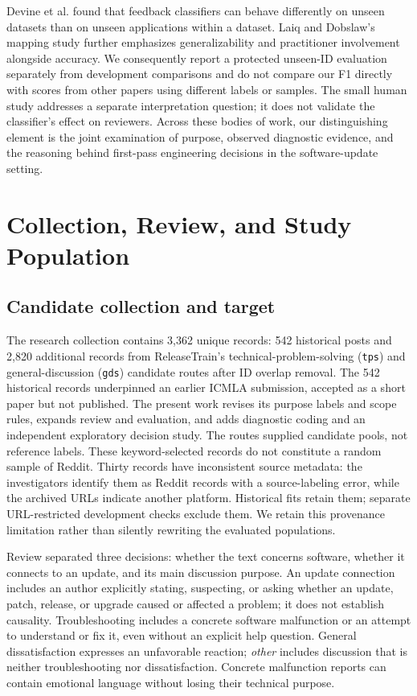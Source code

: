 \documentclass[conference,letterpaper]{IEEEtran}
\begin{document}
Devine et al. \cite{Devine2023Transfer} found that feedback classifiers can behave differently on unseen datasets than on unseen applications within a dataset. Laiq and Dobslaw's mapping study \cite{Laiq2026Mapping} further emphasizes generalizability and practitioner involvement alongside accuracy. We consequently report a protected unseen-ID evaluation separately from development comparisons and do not compare our F1 directly with scores from other papers using different labels or samples. The small human study addresses a separate interpretation question; it does not validate the classifier's effect on reviewers. Across these bodies of work, our distinguishing element is the joint examination of purpose, observed diagnostic evidence, and the reasoning behind first-pass engineering decisions in the software-update setting.
\section{Collection, Review, and Study Population}
\subsection{Candidate collection and target}
The research collection contains 3,362 unique records: 542 historical posts and 2,820 additional records from ReleaseTrain's technical-problem-solving (\texttt{tps}) and general-discussion (\texttt{gds}) candidate routes after ID overlap removal. The 542 historical records underpinned an earlier ICMLA submission, accepted as a short paper but not published. The present work revises its purpose labels and scope rules, expands review and evaluation, and adds diagnostic coding and an independent exploratory decision study. The routes supplied candidate pools, not reference labels. These keyword-selected records do not constitute a random sample of Reddit. Thirty records have inconsistent source metadata: the investigators identify them as Reddit records with a source-labeling error, while the archived URLs indicate another platform. Historical fits retain them; separate URL-restricted development checks exclude them. We retain this provenance limitation rather than silently rewriting the evaluated populations.

Review separated three decisions: whether the text concerns software, whether it connects to an update, and its main discussion purpose. An update connection includes an author explicitly stating, suspecting, or asking whether an update, patch, release, or upgrade caused or affected a problem; it does not establish causality. Troubleshooting includes a concrete software malfunction or an attempt to understand or fix it, even without an explicit help question. General dissatisfaction expresses an unfavorable reaction; \emph{other} includes discussion that is neither troubleshooting nor dissatisfaction. Concrete malfunction reports can contain emotional language without losing their technical purpose.
\end{document}
